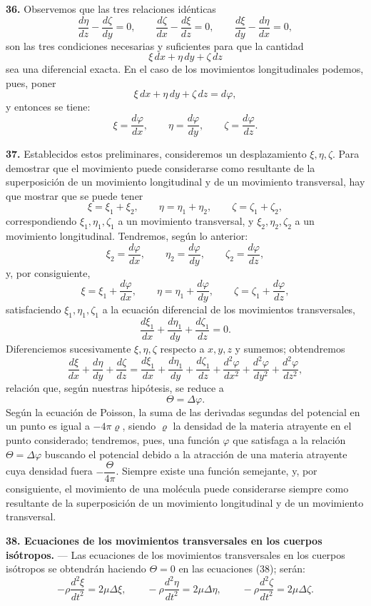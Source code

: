\noindent\textbf{36.} Observemos que las tres relaciones idénticas
\[
\frac{d\eta}{dz}-\frac{d\zeta}{dy}=0,\qquad
\frac{d\zeta}{dx}-\frac{d\xi}{dz}=0,\qquad
\frac{d\xi}{dy}-\frac{d\eta}{dx}=0,
\]
son las tres condiciones necesarias y suficientes para que la cantidad
\[
\xi\,dx+\eta\,dy+\zeta\,dz
\]
sea una diferencial exacta. En el caso de los movimientos longitudinales
podemos, pues, poner
\[
\xi\,dx+\eta\,dy+\zeta\,dz=d\varphi,
\]
y entonces se tiene:
\[
\xi=\frac{d\varphi}{dx},\qquad \eta=\frac{d\varphi}{dy},\qquad \zeta=\frac{d\varphi}{dz}.
\]

\noindent\textbf{37.} Establecidos estos preliminares, consideremos un
desplazamiento $\xi,\eta,\zeta$. Para demostrar que el movimiento puede
considerarse como resultante de la superposición de un movimiento
longitudinal y de un movimiento transversal, hay que mostrar que se puede
tener
\[
\xi=\xi_1+\xi_2,\qquad \eta=\eta_1+\eta_2,\qquad \zeta=\zeta_1+\zeta_2,
\]
correspondiendo $\xi_1,\eta_1,\zeta_1$ a un movimiento transversal, y
$\xi_2,\eta_2,\zeta_2$ a un movimiento longitudinal. Tendremos, según lo
anterior:
\[
\xi_2=\frac{d\varphi}{dx},\qquad \eta_2=\frac{d\varphi}{dy},\qquad \zeta_2=\frac{d\varphi}{dz},
\]
y, por consiguiente,
\[
\xi=\xi_1+\frac{d\varphi}{dx},\qquad \eta=\eta_1+\frac{d\varphi}{dy},
\qquad \zeta=\zeta_1+\frac{d\varphi}{dz},
\]
satisfaciendo $\xi_1,\eta_1,\zeta_1$ a la ecuación diferencial de los
movimientos transversales,
\[
\frac{d\xi_1}{dx}+\frac{d\eta_1}{dy}+\frac{d\zeta_1}{dz}=0.
\]
Diferenciemos sucesivamente $\xi,\eta,\zeta$ respecto a $x,y,z$ y sumemos;
obtendremos
\[
\frac{d\xi}{dx}+\frac{d\eta}{dy}+\frac{d\zeta}{dz}
=\frac{d\xi_1}{dx}+\frac{d\eta_1}{dy}+\frac{d\zeta_1}{dz}
+\frac{d^2\varphi}{dx^2}+\frac{d^2\varphi}{dy^2}+\frac{d^2\varphi}{dz^2},
\]
relación que, según nuestras hipótesis, se reduce a
\[
\Theta=\Delta\varphi.
\]
Según la ecuación de Poisson, la suma de las derivadas segundas del
potencial en un punto es igual a $-4\pi\varrho$, siendo $\varrho$ la
densidad de la materia atrayente en el punto considerado; tendremos, pues,
una función $\varphi$ que satisfaga a la relación $\Theta=\Delta\varphi$
buscando el potencial debido a la atracción de una materia atrayente cuya
densidad fuera $-\dfrac{\Theta}{4\pi}$. Siempre existe una función
semejante, y, por consiguiente, el movimiento de una molécula puede
considerarse siempre como resultante de la superposición de un movimiento
longitudinal y de un movimiento transversal.

\noindent\textbf{38. Ecuaciones de los movimientos transversales en los
cuerpos isótropos.} — Las ecuaciones de los movimientos transversales en
los cuerpos isótropos se obtendrán haciendo $\Theta=0$ en las ecuaciones
(38); serán:
\begin{equation}
-\rho\frac{d^2\xi}{dt^2}=2\mu\Delta\xi,\qquad
-\rho\frac{d^2\eta}{dt^2}=2\mu\Delta\eta,\qquad
-\rho\frac{d^2\zeta}{dt^2}=2\mu\Delta\zeta.
\tag{39}
\end{equation}

